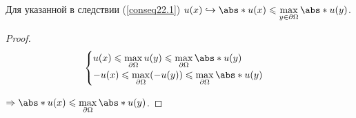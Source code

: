 \begin{conseq}
Для указанной в следствии (\ref{conseq22.1}) $u(x) \hookrightarrow \abs*{u(x)} \leq \max\limits_{y \in \partial \Omega} \abs*{u(y)}$.
\begin{proof}

\begin{equation}
  \begin{cases}
  u(x) \leq \max\limits_{\partial \Omega}u(y) \leq \max\limits_{\partial \Omega}\abs*{u(y)}\\  
  -u(x) \leq \max\limits_{\partial \Omega}(-u(y)) \leq \max\limits_{\partial \Omega}\abs*{u(y)}\\
  \end{cases}
  \end{equation}  
  
  $\Rightarrow \abs*{u(x)} \leq \max\limits_{\partial \Omega}\abs*{u(y)}$.
\end{proof}
\end{conseq}
